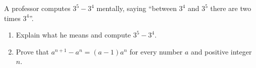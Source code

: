 A professor computes $3^5-3^4$ mentally, saying ``between $3^4$ and $3^5$ there are two times $3^4$''.
\begin{enumerate}
\item[(a)] Explain what he means and compute $3^5-3^4$.
\item[(b)] Prove that $a^{n+1}-a^n=(a-1)a^n$ for every number $a$ and positive integer $n$.
\end{enumerate}
